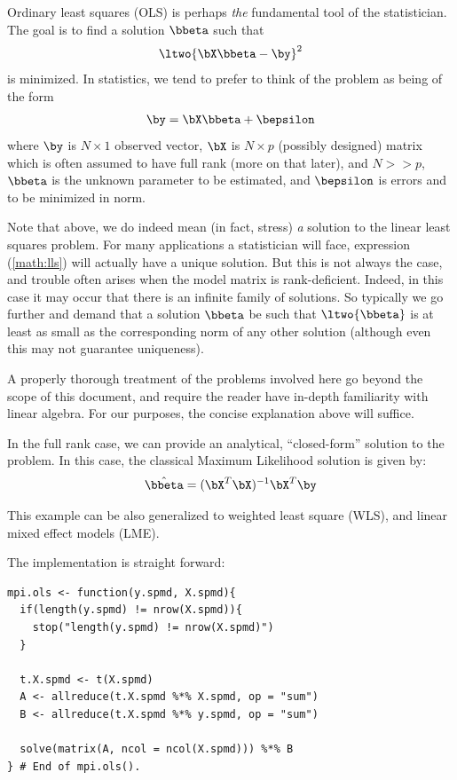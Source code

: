 Ordinary least squares (OLS)
is perhaps \emph{the} fundamental tool of the statistician.  The goal is to find a solution $\bbeta$ such that
\begin{align}
\ltwo{ \bX\bbeta - \by }^2 \label{math:lls}
\end{align}
is minimized.  In statistics, we tend to prefer to think of the problem as being of the form
\begin{align}
\by = \bX\bbeta + \bepsilon \label{math:statslls}
\end{align}
where $\by$ is $N\times 1$ observed vector,
$\bX$ is $N\times p$ (possibly designed) matrix which is often assumed to have full rank (more on that later), and $N >> p$,
$\bbeta$ is the unknown parameter to be estimated,
and $\bepsilon$ is errors and to be minimized in norm.

Note that above, we do indeed mean (in fact, stress) \emph{a} solution to the linear least squares problem.  For many applications a statistician will face, expression (\ref{math:lls}) will actually have a unique solution.  But this is not always the case, and trouble often arises when the model matrix is rank-deficient.  Indeed, in this case it may occur that there is an infinite family of solutions.  So typically we go further and demand that a solution $\bbeta$ be such that $\ltwo{\bbeta}$ is at least as small as the corresponding norm of any other solution (although even this may not guarantee uniqueness).

A properly thorough treatment of the problems involved here go beyond the scope of this document, and require the reader have in-depth familiarity with linear algebra.  For our purposes, the concise explanation above will suffice.  



In the full rank case, we can provide an analytical, ``closed-form'' solution to the problem.  In this case, the classical Maximum Likelihood solution is given by:
\begin{align}
 \hat{\bbeta} = (\bX^T\bX)^{-1}\bX^T\by \label{math:ols}
\end{align}
 
This example can be also generalized to weighted least square (WLS),
and linear mixed effect models (LME).

The implementation is straight forward:
\begin{lstlisting}[language=rr,title=R Code]
mpi.ols <- function(y.spmd, X.spmd){
  if(length(y.spmd) != nrow(X.spmd)){
    stop("length(y.spmd) != nrow(X.spmd)")
  }

  t.X.spmd <- t(X.spmd)
  A <- allreduce(t.X.spmd %*% X.spmd, op = "sum")
  B <- allreduce(t.X.spmd %*% y.spmd, op = "sum")

  solve(matrix(A, ncol = ncol(X.spmd))) %*% B
} # End of mpi.ols().

\end{lstlisting}

